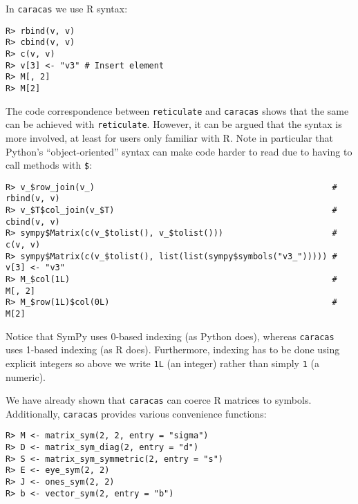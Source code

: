 In \texttt{caracas} we use R syntax:

\begin{verbatim}
R> rbind(v, v)
R> cbind(v, v)
R> c(v, v)
R> v[3] <- "v3" # Insert element
R> M[, 2]
R> M[2]
\end{verbatim}

The code correspondence between \texttt{reticulate} and \texttt{caracas} shows
that the same can be achieved with \texttt{reticulate}. However, it can be argued that
the syntax is more involved, at least for users only familiar with R. Note in particular that
Python's ``object-oriented'' syntax can make code harder to read due to
having to call methods with \texttt{\$}:

\begin{verbatim}
R> v_$row_join(v_)                                                # rbind(v, v)
R> v_$T$col_join(v_$T)                                            # cbind(v, v)
R> sympy$Matrix(c(v_$tolist(), v_$tolist()))                      # c(v, v)
R> sympy$Matrix(c(v_$tolist(), list(list(sympy$symbols("v3_"))))) # v[3] <- "v3"
R> M_$col(1L)                                                     # M[, 2]
R> M_$row(1L)$col(0L)                                             # M[2]
\end{verbatim}

Notice that SymPy uses 0-based indexing (as Python does), whereas
\texttt{caracas} uses 1-based indexing (as R does). Furthermore, indexing
has to be done using explicit integers
so above we write \texttt{1L} (an integer) rather than simply \texttt{1}
(a numeric).

We have already shown that \texttt{caracas} can coerce R matrices to
symbols. Additionally, \texttt{caracas} provides various convenience
functions:

\begin{verbatim}
R> M <- matrix_sym(2, 2, entry = "sigma")
R> D <- matrix_sym_diag(2, entry = "d")
R> S <- matrix_sym_symmetric(2, entry = "s")
R> E <- eye_sym(2, 2)
R> J <- ones_sym(2, 2)
R> b <- vector_sym(2, entry = "b")
\end{verbatim}

